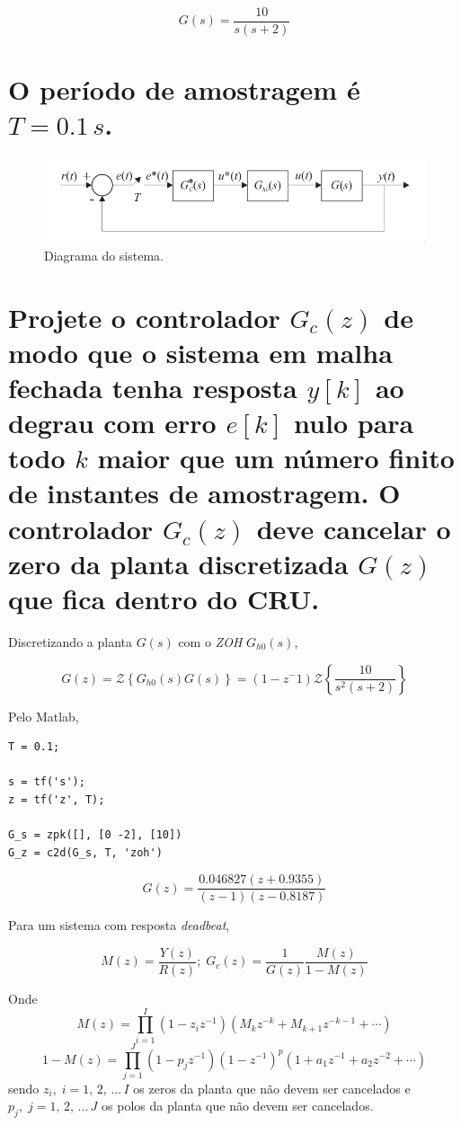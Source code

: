 \documentclass{article}
\begin{document}
    \[ G(s) = \frac{10}{s(s+2)} \]

    \section*{\normalsize{\normalfont O período de amostragem é $T = 0.1\,s$.}}

    \begin{figure}[H]
       \centering
            \includegraphics[width=1\linewidth]{images/diagrama.png}
            \caption{Diagrama do sistema.}
            \label{fig:diagram}
    \end{figure}

    \section{\normalsize{\normalfont Projete o controlador $G_c(z)$ de modo que
    o sistema em malha fechada tenha resposta $y[k]$ ao degrau com erro $e[k]$
    nulo para todo $k$ maior que um número finito de instantes de amostragem.
    O controlador $G_c(z)$ deve cancelar o zero da planta discretizada $G(z)$
    que fica dentro do CRU.}}

        {Discretizando a planta $G(s)$ com o \textit{ZOH} $G_{h0}(s)$,}

        \[ G(z) = \mathcal{Z}\left\{ G_{h0}(s)G(s)\right\}
                = (1-z^-1)\mathcal{Z}\left\{ \frac{10}{s^2(s+2)}\right\} \]

        {Pelo Matlab,}
        \begin{lstlisting}
T = 0.1;

s = tf('s');
z = tf('z', T);

G_s = zpk([], [0 -2], [10])
G_z = c2d(G_s, T, 'zoh')
        \end{lstlisting}

        \[ G(z) = \frac{0.046827(z+0.9355)}{(z-1)(z-0.8187)} \]

        {Para um sistema com resposta \textit{deadbeat},}

        \[ M(z) = \frac{Y(z)}{R(z)};\; G_c(z) = \frac{1}{G(z)}\frac{M(z)}{1-M(z)} \]

        {Onde}
        \[ M(z) = \prod_{i=1}^I (1-z_i z^{-1}) (M_{k} z^{-k} + M_{k+1} z^{-k-1} + \cdots) \]
        \[ 1 - M(z) = \prod_{j=1}^{J} (1-p_j z^{-1})(1-z^{-1})^p (1 + a_1 z^{-1} + a_2 z^{-2} + \cdots) \]
        {sendo $z_i,\; i = 1,\, 2,\, ...\,I$ os zeros da planta que não devem
            ser cancelados e $p_j,\; j = 1,\, 2,\, ...\,J$ os polos da planta
            que não devem ser cancelados.}
\end{document}
